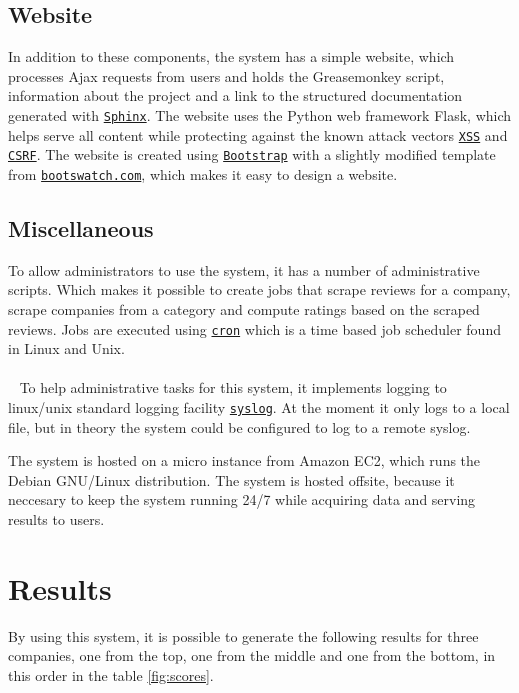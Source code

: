 \documentclass[10pt]{IEEEtran}
\begin{document}
\subsection{Website}
In addition to these components, the system has a simple website, which processes Ajax requests from users and holds the Greasemonkey script, information about the project and a link to the structured documentation generated with \href{http://sphinx-doc.org/}{\texttt{Sphinx}}. The website uses the Python web framework Flask, which helps serve all content while protecting against the known attack vectors \href{https://www.owasp.org/index.php/Cross-site_Scripting_(XSS)}{\texttt{XSS}} and \href{https://www.owasp.org/index.php/Cross-Site_Request_Forgery_(CSRF)}{\texttt{CSRF}}. The website is created using \href{http://getbootstrap.com/}{\texttt{Bootstrap}} with a slightly modified template from \href{http://bootswatch.com/flatly/}{\texttt{bootswatch.com}}, which makes it easy to design a website.

\subsection{Miscellaneous}
To allow administrators to use the system, it has a number of administrative scripts. Which makes it possible to create jobs that scrape reviews for a company, scrape companies from a category and compute ratings based on the scraped reviews. Jobs are executed using \href{http://pubs.opengroup.org/onlinepubs/009696699/utilities/crontab.html}{\texttt{cron}} which is a time based job scheduler found in Linux and Unix.
\\~
\\~
To help administrative tasks for this system, it implements logging to linux/unix standard logging facility \href{http://tools.ietf.org/html/rfc5424}{\texttt{syslog}}. At the moment it only logs to a local file, but in theory the system could be configured to log to a remote syslog.

The system is hosted on a micro instance from Amazon EC2, which runs the Debian GNU/Linux distribution. The system is hosted offsite, because it neccesary to keep the system running 24/7 while acquiring data and serving results to users.

\section{Results}
By using this system, it is possible to generate the following results for three companies, one from the top, one from the middle and one from the bottom, in this order in the table \ref{fig:scores}.
\end{document}
